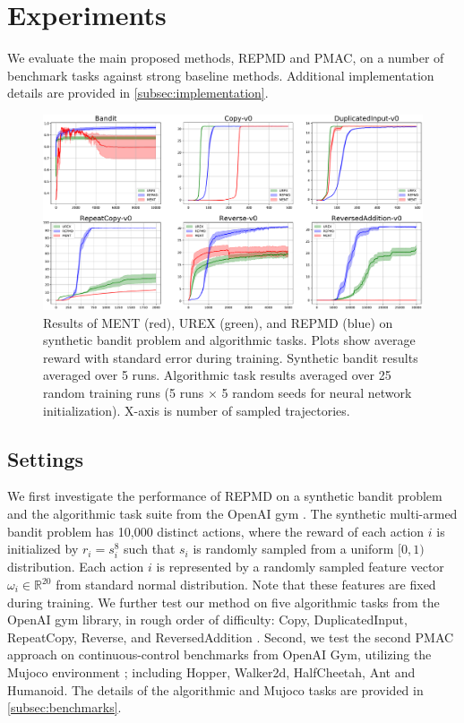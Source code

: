 
\section{Experiments}
\label{sec:experiments}

We evaluate the main proposed methods, REPMD and PMAC,
on a number of benchmark tasks against strong baseline methods.
Additional implementation details are provided in \cref{subsec:implementation}. 

\begin{figure}[t]
\centering
\includegraphics[width=0.75\linewidth]{./bandit_algorithmic_results.pdf} \vspace{-0.3cm} 
\caption{
Results of MENT (red), UREX (green), and REPMD (blue) on synthetic bandit
problem and algorithmic tasks.
Plots show average reward with standard error during training.
Synthetic bandit results averaged over 5 runs.
Algorithmic task results averaged over 25 random training runs
(5 runs $\times$ 5 random seeds for neural network initialization).
X-axis is number of sampled trajectories.
} 
\label{fig:results}
\vspace{-0.2cm}
\end{figure}

\subsection{Settings}
\label{subsec:tasks}

We first investigate the performance of REPMD on a synthetic bandit problem
and the algorithmic task suite from the OpenAI gym \citep{brockman2016openai}.
The synthetic multi-armed bandit problem has 10,000 distinct actions,
where
the reward of each action $i$ is initialized by $r_i = s_i^{8}$
such that $s_i$ is randomly sampled from a uniform $[0,1)$ distribution.
Each action $i$ is represented by a randomly sampled feature vector
$\omega_i\in \mathbb{R}^{20}$ from standard normal distribution.
Note that these features are fixed during training.
We further test our method on five algorithmic tasks from the OpenAI gym
library, in rough order of difficulty:
Copy, DuplicatedInput, RepeatCopy, Reverse, and ReversedAddition
\citep{brockman2016openai}.
%
Second, we test the second PMAC approach on continuous-control benchmarks
from OpenAI Gym, utilizing the Mujoco environment
\citep{brockman2016openai,todorov2012mujoco};
including Hopper, Walker2d, HalfCheetah, Ant and Humanoid.
The details of the algorithmic and Mujoco tasks are provided in
\cref{subsec:benchmarks}. 

